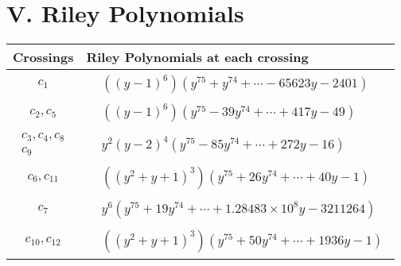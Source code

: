 \documentclass[1p]{elsarticle_modified}
\theoremstyle{definition}
\begin{document}
\centering \section*{ V. Riley Polynomials}
\begin{tabular}{m{50pt}|m{274pt}}
Crossings & \hspace{64pt}Riley Polynomials at each crossing \\
\hline $$\begin{aligned}c_{1}\end{aligned}$$&$\begin{aligned}
&((y-1)^6)(y^{75}+y^{74}+\cdots-65623 y-2401)
\end{aligned}$\\
\hline $$\begin{aligned}c_{2},c_{5}\end{aligned}$$&$\begin{aligned}
&((y-1)^6)(y^{75}-39 y^{74}+\cdots+417 y-49)
\end{aligned}$\\
\hline $$\begin{aligned}c_{3},c_{4},c_{8}\\c_{9}\end{aligned}$$&$\begin{aligned}
&y^2(y-2)^4(y^{75}-85 y^{74}+\cdots+272 y-16)
\end{aligned}$\\
\hline $$\begin{aligned}c_{6},c_{11}\end{aligned}$$&$\begin{aligned}
&((y^2+y+1)^3)(y^{75}+26 y^{74}+\cdots+40 y-1)
\end{aligned}$\\
\hline $$\begin{aligned}c_{7}\end{aligned}$$&$\begin{aligned}
&y^6(y^{75}+19 y^{74}+\cdots+1.28483\times10^{8} y-3211264)
\end{aligned}$\\
\hline $$\begin{aligned}c_{10},c_{12}\end{aligned}$$&$\begin{aligned}
&((y^2+y+1)^3)(y^{75}+50 y^{74}+\cdots+1936 y-1)
\end{aligned}$\\
\hline
\end{tabular}
\vskip 2pc
\end{document}
